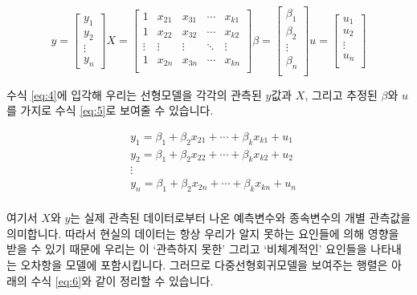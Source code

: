 \documentclass[
]{book}
\begin{document}
\begin{equation} \label{eq:4}
y = \begin{bmatrix}y_1 \\ y_2 \\ \vdots \\ y_n \end{bmatrix}
X = \begin{bmatrix}1 & x_{21} & x_{31} & \cdots & x_{k1}\\
                   1 & x_{22} & x_{32} & \cdots & x_{k2}\\
              \vdots & \vdots & \vdots & \ddots & \vdots\\
                   1 & x_{2n} & x_{3n} & \cdots & x_{kn}\\\end{bmatrix}
\beta = \begin{bmatrix} \beta_1 \\ \beta_2 \\ \vdots \\ \beta_n \\\end{bmatrix}
u = \begin{bmatrix} u_1 \\ u_2 \\ \vdots \\ u_n \\\end{bmatrix}
\end{equation}

수식 \ref{eq:4}에 입각해 우리는 선형모델을 각각의 관측된 \(y\)값과 \(X\), 그리고 추정된 \(\beta\)와 \(u\)를 가지로 수식 \ref{eq:5}로 보여줄 수 있습니다.

\begin{equation} \label{eq:5}
\begin{split}
&y_1 = \beta_1 + \beta_2x_{21} +\cdots+\beta_kx_{k1} + u_1\\
&y_2 = \beta_1 + \beta_2x_{22} +\cdots+\beta_kx_{k2} + u_2\\
&\vdots\\
&y_n = \beta_1 + \beta_2x_{2n} +\cdots+\beta_kx_{kn} + u_n\\
\end{split}
\end{equation}

여기서 \(X\)와 \(y\)는 실제 관측된 데이터로부터 나온 예측변수와 종속변수의 개별 관측값을 의미합니다. 따라서 현실의 데이터는 항상 우리가 알지 못하는 요인들에 의해 영향을 받을 수 있기 때문에 우리는 이 `관측하지 못한' 그리고 `비체계적인' 요인들을 나타내는 오차항을 모델에 포함시킵니다. 그러므로 다중선형회귀모델을 보여주는 행렬은 아래의 수식 \ref{eq:6}와 같이 정리할 수 있습니다.
\end{document}
